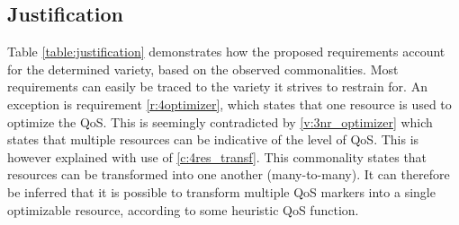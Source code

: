 \subsection{Justification}
Table \ref{table:justification} demonstrates how the proposed requirements account for the determined variety, based on the observed commonalities. Most requirements can easily be traced  to the variety it strives to restrain for. An exception is requirement \ref{r:4optimizer}, which states that one resource is used to optimize the QoS. This is seemingly contradicted by \ref{v:3nr_optimizer} which states that multiple resources can be indicative of the level of QoS. This is however explained with use of \ref{c:4res_transf}. This commonality states that resources can be transformed into one another (many-to-many). It can therefore be inferred that it is possible to transform multiple QoS markers into a single optimizable resource, according to some heuristic QoS function.


